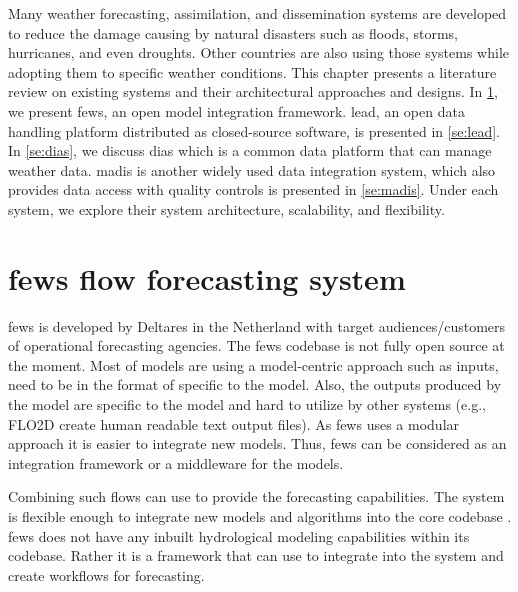 Many weather forecasting, assimilation, and dissemination systems are developed to reduce the damage causing by natural disasters such as floods, storms, hurricanes, and even droughts. %
Other countries are also using those systems while adopting them %
to specific weather conditions.%
This chapter presents a literature review on existing systems and their architectural approaches and designs. In \cref{se:fews}, we present \acrfull{fews}, an open model integration framework. \acrfull{lead}, an open data handling platform distributed as closed-source software, is presented in \cref{se:lead}. %
In \cref{se:dias}, we discuss \acrfull{dias} which is a common data platform that can manage weather data. \acrfull{madis} is another widely used data integration system, which also provides data access with quality controls is presented in \cref{se:madis}. Under each system, we explore their system architecture, scalability, and flexibility.



\section{\acrshort{fews} flow forecasting system}
\label{se:fews}

\acrshort{fews} \cite{Werner2013TheSystem} is developed by Deltares in the Netherland with target audiences/customers of operational forecasting agencies. The \acrshort{fews} codebase is not fully open source at the moment.
Most of models are using a model-centric approach such as inputs, need to be in the format of specific to the model. Also, the outputs produced by the model are specific to the model and hard to utilize by other systems (e.g., FLO2D create human readable text output files). As \acrshort{fews} uses a modular approach it is easier to integrate new models. 
Thus, \acrshort{fews} can be considered as an integration framework or a middleware for the models.

 Combining such flows can use to provide the forecasting capabilities. The system is flexible enough to integrate new models and algorithms into the core codebase \cite{Werner2013TheSystem}. \acrshort{fews} does not have any inbuilt hydrological modeling capabilities within its codebase. Rather it is a framework that can use to integrate into the system and create workflows for forecasting.

